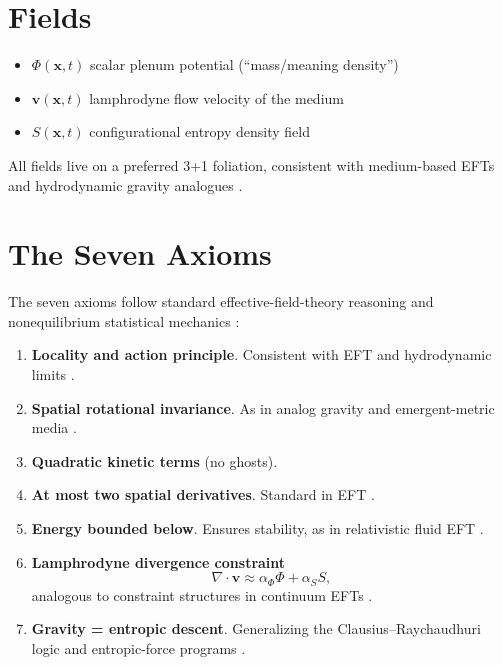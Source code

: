 \documentclass[11pt,a4paper]{article}
\begin{document}
\section{Fields}

\begin{itemize}[leftmargin=1.5cm]
\item $\Phi(\mathbf{x},t)$ \quad scalar plenum potential (“mass/meaning density”)
\item $\mathbf{v}(\mathbf{x},t)$ \quad lamphrodyne flow velocity of the medium
\item $S(\mathbf{x},t)$ \quad configurational entropy density field
\end{itemize}

All fields live on a preferred 3+1 foliation, consistent with medium-based EFTs \cite{volovik2003} and hydrodynamic gravity analogues \cite{barcelo2005}.

\section{The Seven Axioms}

The seven axioms follow standard effective-field-theory reasoning \cite{weinberg1995} and nonequilibrium statistical mechanics \cite{onsager1931,prigogine1967}:

\begin{enumerate}
\item \textbf{Locality and action principle}.  
  Consistent with EFT and hydrodynamic limits \cite{weinberg1995,nicolis2013}.

\item \textbf{Spatial rotational invariance}.  
  As in analog gravity and emergent-metric media \cite{barcelo2005,andersson2007}.

\item \textbf{Quadratic kinetic terms} (no ghosts).  

\item \textbf{At most two spatial derivatives}.  
Standard in EFT \cite{weinberg1995,cheung2008}.

\item \textbf{Energy bounded below}.  
  Ensures stability, as in relativistic fluid EFT \cite{andersson2007}.

\item \textbf{Lamphrodyne divergence constraint}  
\[
\nabla\!\cdot\!\mathbf{v} \approx \alpha_\Phi \Phi + \alpha_S S,
\]
  analogous to constraint structures in continuum EFTs \cite{nicolis2013}.

\item \textbf{Gravity = entropic descent}.  
  Generalizing the Clausius–Raychaudhuri logic \cite{jacobson1995,raychaudhuri1955} and entropic-force programs \cite{verlinde2011,padmanabhan2005}.
\end{enumerate}
\end{document}
